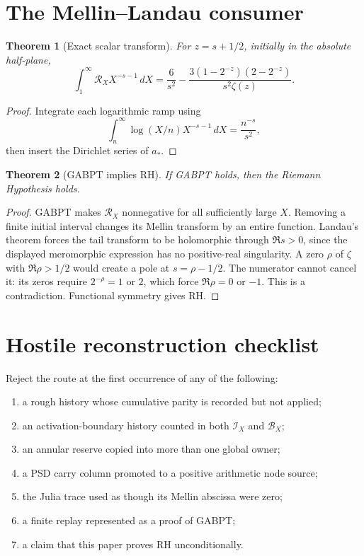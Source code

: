 \documentclass[11pt]{article}
\newtheorem{theorem}{Theorem}[section]
\newcommand{\1}{\mathbf 1}
\newcommand{\RR}{\mathcal R}
\newcommand{\BB}{\mathcal B}
\newcommand{\II}{\mathcal I}
\begin{document}
\section{The Mellin--Landau consumer}
\begin{theorem}[Exact scalar transform]\label{thm:mellin}
For \(z=s+1/2\), initially in the absolute half-plane,
\[
\int_1^\infty\RR_X X^{-s-1}\,dX
=\frac6{s^2}-\frac{3(1-2^{-z})(2-2^{-z})}{s^2\zeta(z)}.
\]
\end{theorem}
\begin{proof}
Integrate each logarithmic ramp using
\[
\int_n^\infty\log(X/n)X^{-s-1}\,dX=\frac{n^{-s}}{s^2},
\]
then insert the Dirichlet series of \(a_*\).
\end{proof}

\begin{theorem}[GABPT implies RH]\label{thm:rh}
If GABPT holds, then the Riemann Hypothesis holds.
\end{theorem}
\begin{proof}
GABPT makes \(\RR_X\) nonnegative for all sufficiently large \(X\). Removing a
finite initial interval changes its Mellin transform by an entire function.
Landau's theorem forces the tail transform to be holomorphic through
\(\Re s>0\), since the displayed meromorphic expression has no positive-real
singularity. A zero \(\rho\) of \(\zeta\) with \(\Re\rho>1/2\) would create a
pole at \(s=\rho-1/2\). The numerator cannot cancel it: its zeros require
\(2^{-\rho}=1\) or \(2\), which force \(\Re\rho=0\) or \(-1\). This is a
contradiction. Functional symmetry gives RH.
\end{proof}

\section{Hostile reconstruction checklist}
Reject the route at the first occurrence of any of the following:
\begin{enumerate}
\item a rough history whose cumulative parity is recorded but not applied;
\item an activation-boundary history counted in both \(\II_X\) and \(\BB_X\);
\item an annular reserve copied into more than one global owner;
\item a PSD carry column promoted to a positive arithmetic node source;
\item the Julia trace used as though its Mellin abscissa were zero;
\item a finite replay represented as a proof of GABPT;
\item a claim that this paper proves RH unconditionally.
\end{enumerate}
\end{document}
